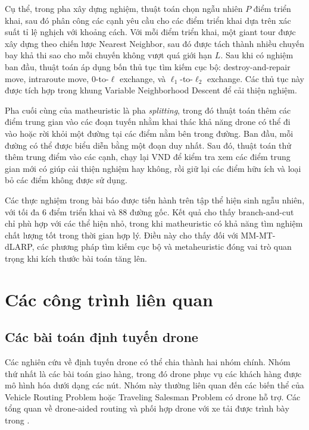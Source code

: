 Cụ thể, trong pha xây dựng nghiệm, thuật toán chọn ngẫu nhiên \(P\) điểm triển khai, sau đó phân công các cạnh yêu cầu cho các điểm triển khai dựa trên xác suất tỉ lệ nghịch với khoảng cách. Với mỗi điểm triển khai, một giant tour được xây dựng theo chiến lược Nearest Neighbor, sau đó được tách thành nhiều chuyến bay khả thi sao cho mỗi chuyến không vượt quá giới hạn \(L\). Sau khi có nghiệm ban đầu, thuật toán áp dụng bốn thủ tục tìm kiếm cục bộ: destroy-and-repair move, intraroute move, \(0\)-to-\(\ell\) exchange, và \(\ell_1\)-to-\(\ell_2\) exchange. Các thủ tục này được tích hợp trong khung Variable Neighborhood Descent để cải thiện nghiệm.

Pha cuối cùng của matheuristic là pha \textit{splitting}, trong đó thuật toán thêm các điểm trung gian vào các đoạn tuyến nhằm khai thác khả năng drone có thể đi vào hoặc rời khỏi một đường tại các điểm nằm bên trong đường. Ban đầu, mỗi đường có thể được biểu diễn bằng một đoạn duy nhất. Sau đó, thuật toán thử thêm trung điểm vào các cạnh, chạy lại VND để kiểm tra xem các điểm trung gian mới có giúp cải thiện nghiệm hay không, rồi giữ lại các điểm hữu ích và loại bỏ các điểm không được sử dụng.

Các thực nghiệm trong bài báo được tiến hành trên tập thể hiện sinh ngẫu nhiên, với tối đa 6 điểm triển khai và 88 đường gốc. Kết quả cho thấy branch-and-cut chỉ phù hợp với các thể hiện nhỏ, trong khi matheuristic có khả năng tìm nghiệm chất lượng tốt trong thời gian hợp lý. Điều này cho thấy đối với MM-MT-dLARP, các phương pháp tìm kiếm cục bộ và metaheuristic đóng vai trò quan trọng khi kích thước bài toán tăng lên.

\section{Các công trình liên quan}

\subsection{Các bài toán định tuyến drone}

Các nghiên cứu về định tuyến drone có thể chia thành hai nhóm chính. Nhóm thứ nhất là các bài toán giao hàng, trong đó drone phục vụ các khách hàng được mô hình hóa dưới dạng các nút. Nhóm này thường liên quan đến các biến thể của Vehicle Routing Problem hoặc Traveling Salesman Problem có drone hỗ trợ. Các tổng quan về drone-aided routing và phối hợp drone với xe tải được trình bày trong \cite{macrina2020droneReview,chung2020droneTruck}.

